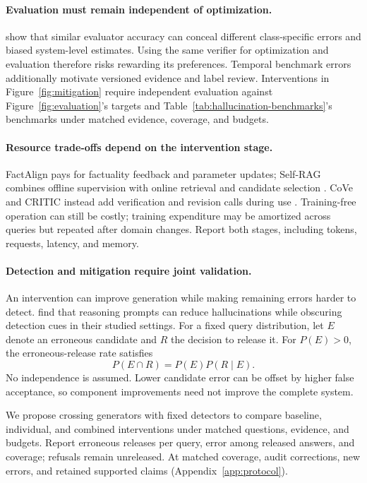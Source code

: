 \paragraph{Evaluation must remain independent of optimization.}
\citet{godbole-jia-2025-verify} show that similar evaluator accuracy can conceal different class-specific errors and biased system-level estimates. Using the same verifier for optimization and evaluation therefore risks rewarding its preferences. Temporal benchmark errors \citep{jiang-etal-2026-benchmarks} additionally motivate versioned evidence and label review. Interventions in Figure~\ref{fig:mitigation} require independent evaluation against Figure~\ref{fig:evaluation}'s targets and Table~\ref{tab:hallucination-benchmarks}'s benchmarks under matched evidence, coverage, and budgets.

\paragraph{Resource trade-offs depend on the intervention stage.}
FactAlign pays for factuality feedback and parameter updates; Self-RAG combines offline supervision with online retrieval and candidate selection \citep{huang-chen-2024-factalign,extselfrag2024}. CoVe and CRITIC instead add verification and revision calls during use \citep{dhuliawala-etal-2024-chain,extcritic2024}. Training-free operation can still be costly; training expenditure may be amortized across queries but repeated after domain changes. Report both stages, including tokens, requests, latency, and memory.

\paragraph{Detection and mitigation require joint validation.}
An intervention can improve generation while making remaining errors harder to detect. \citet{cheng-etal-2025-chain} find that reasoning prompts can reduce hallucinations while obscuring detection cues in their studied settings. For a fixed query distribution, let $E$ denote an erroneous candidate and $R$ the decision to release it. For $P(E)>0$, the erroneous-release rate satisfies
\begin{equation}\label{eq:release}
P(E\cap R)=P(E)P(R\mid E).
\end{equation}
No independence is assumed. Lower candidate error can be offset by higher false acceptance, so component improvements need not improve the complete system.

We propose crossing generators with fixed detectors to compare baseline, individual, and combined interventions under matched questions, evidence, and budgets. Report erroneous releases per query, error among released answers, and coverage; refusals remain unreleased. At matched coverage, audit corrections, new errors, and retained supported claims (Appendix~\ref{app:protocol}).
